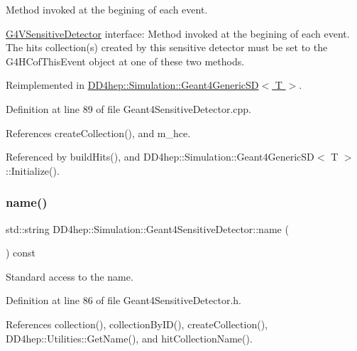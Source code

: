 Method invoked at the begining of each event. 

\hyperlink{class_g4_v_sensitive_detector}{G4\+V\+Sensitive\+Detector} interface\+: Method invoked at the begining of each event. The hits collection(s) created by this sensitive detector must be set to the G4\+H\+Cof\+This\+Event object at one of these two methods. 

Reimplemented in \hyperlink{class_d_d4hep_1_1_simulation_1_1_geant4_generic_s_d_a1e65440bc948eb7ba84792fcfdd002ed}{D\+D4hep\+::\+Simulation\+::\+Geant4\+Generic\+S\+D$<$ T $>$}.



Definition at line 89 of file Geant4\+Sensitive\+Detector.\+cpp.



References create\+Collection(), and m\+\_\+hce.



Referenced by build\+Hits(), and D\+D4hep\+::\+Simulation\+::\+Geant4\+Generic\+S\+D$<$ T $>$\+::\+Initialize().

\hypertarget{class_d_d4hep_1_1_simulation_1_1_geant4_sensitive_detector_a55cba2957295dc39988b888d0b5a5127}{}\label{class_d_d4hep_1_1_simulation_1_1_geant4_sensitive_detector_a55cba2957295dc39988b888d0b5a5127} 
\subsubsection{\texorpdfstring{name()}{name()}}
{\footnotesize\ttfamily std\+::string D\+D4hep\+::\+Simulation\+::\+Geant4\+Sensitive\+Detector\+::name (\begin{DoxyParamCaption}{ }\end{DoxyParamCaption}) const\hspace{0.3cm}{\ttfamily [inline]}}



Standard access to the name. 



Definition at line 86 of file Geant4\+Sensitive\+Detector.\+h.



References collection(), collection\+By\+I\+D(), create\+Collection(), D\+D4hep\+::\+Utilities\+::\+Get\+Name(), and hit\+Collection\+Name().



